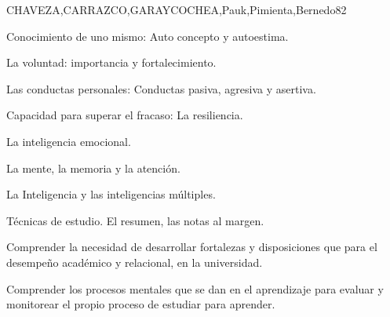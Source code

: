 \begin{syllabus}
\begin{unit}{}{CHAVEZA,CARRAZCO,GARAYCOCHEA,Pauk,Pimienta,Bernedo}{8}{2}
\begin{topics}
        \item Conocimiento de uno mismo: Auto concepto y autoestima.
        \item La voluntad: importancia y fortalecimiento.
        \item Las conductas personales: Conductas pasiva, agresiva y asertiva.
        \item Capacidad para superar el fracaso: La resiliencia.
        \item La inteligencia emocional.
        \item La mente, la memoria  y la atención.
        \item La Inteligencia y las inteligencias múltiples. 
        \item Técnicas de  estudio. El resumen, las notas al margen.       
\end{topics}
\begin{unitgoals}
        \item Comprender la necesidad de desarrollar  fortalezas y disposiciones que para el desempeño académico y relacional, en la universidad.
        \item Comprender los procesos mentales que se dan en el aprendizaje para evaluar y monitorear el propio proceso de estudiar para aprender.
\end{unitgoals}
\end{unit}


\end{syllabus}
